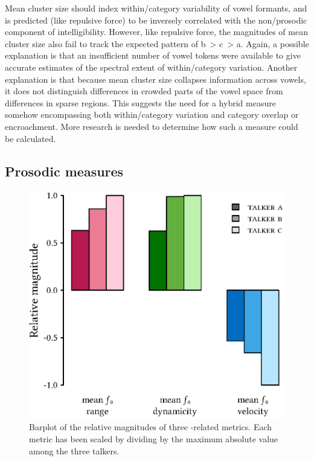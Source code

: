 Mean cluster size should index within\-/category variability of vowel formants, and is predicted (like repulsive force) to be inversely correlated with the non\-/prosodic component of intelligibility.  However, like repulsive force, the magnitudes of mean cluster size also fail to track the expected pattern of \ac{b}~> \ac{c}~> \ac{a}.  Again, a possible explanation is that an insufficient number of vowel tokens were available to give accurate estimates of the spectral extent of within\-/category variation.  Another explanation is that because mean cluster size collapses information across vowels, it does not distinguish differences in crowded parts of the vowel space from differences in sparse regions.  This suggests the need for a hybrid measure somehow encompassing both within\-/category variation and category overlap or encroachment.  More research is needed to determine how such a measure could be calculated.

\subsection{Prosodic measures}
\begin{figure}[bt]
	\begin{centering}
	\includegraphics{figures/posthocs/ProsodicMeasuresPitchOnly.eps}
	\caption[Barplot of \fo{} metrics]{Barplot of the relative magnitudes of three \fo-related metrics.  Each metric has been scaled by dividing by the maximum absolute value among the three talkers.\label{fig:ProsodicMeasuresPitch}}
	\end{centering}
\end{figure}

